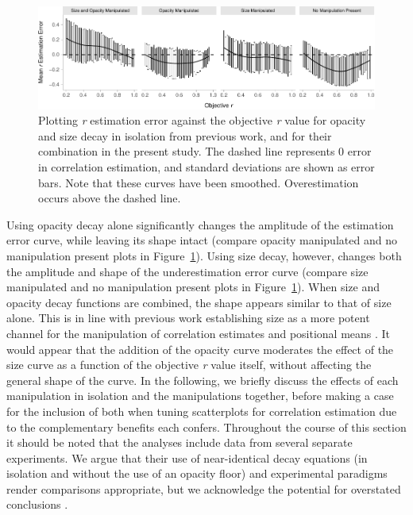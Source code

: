 \documentclass[sigconf]{acmart}
\begin{document}
\begin{figure}

{\centering \includegraphics[width=1\textwidth,height=\textheight]{size_and_opacity_files/figure-pdf/fig-est-multi-exp-1.pdf}

}

\caption{\label{fig-est-multi-exp}Plotting \emph{r} estimation error
against the objective \emph{r} value for opacity and size decay in
isolation from previous work, and for their combination in the present
study. The dashed line represents 0 error in correlation estimation, and
standard deviations are shown as error bars. Note that these curves have
been smoothed. Overestimation occurs above the dashed line.}

\end{figure}

Using opacity decay alone significantly changes the amplitude of the
estimation error curve, while leaving its shape intact (compare opacity
manipulated and no manipulation present plots in
Figure~\ref{fig-est-multi-exp}). Using size decay, however, changes both
the amplitude and shape of the underestimation error curve (compare size
manipulated and no manipulation present plots in
Figure~\ref{fig-est-multi-exp}). When size and opacity decay functions
are combined, the shape appears similar to that of size alone. This is
in line with previous work establishing size as a more potent channel
for the manipulation of correlation estimates \citep{strain_2023b} and
positional means \citep{hong_2021}. It would appear that the addition of
the opacity curve moderates the effect of the size curve as a function
of the objective \emph{r} value itself, without affecting the general
shape of the curve. In the following, we briefly discuss the effects of
each manipulation in isolation and the manipulations together, before
making a case for the inclusion of both when tuning scatterplots for
correlation estimation due to the complementary benefits each confers.
Throughout the course of this section it should be noted that the
analyses include data from several separate experiments. We argue that
their use of near-identical decay equations (in isolation and without
the use of an opacity floor) and experimental paradigms render
comparisons appropriate, but we acknowledge the potential for overstated
conclusions \citep{strain_2023, strain_2023b}.
\end{document}
